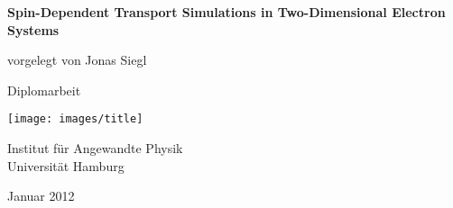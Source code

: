 \begin{titlepage}
\begin{center}
\vspace{2cm}
  \begin{spacing}{1.1}
    \huge\textbf{Spin-Dependent Transport Simulations in Two-Dimensional Electron Systems}
  \end{spacing}
  \par
  \vspace{.5in}
  {\large vorgelegt von Jonas Siegl}\par
  \vspace{.5in}
  {\Large Diplomarbeit}
  \par

  \vfill
  \vspace{.5in}
  \texttt{[image: images/title]}
  \par
  \vspace{.5in}
  Institut f\"ur Angewandte Physik\\
  Universit\"at Hamburg
  \par
  \vspace{0.5in}
  Januar 2012 
\end{center}
\end{titlepage}
